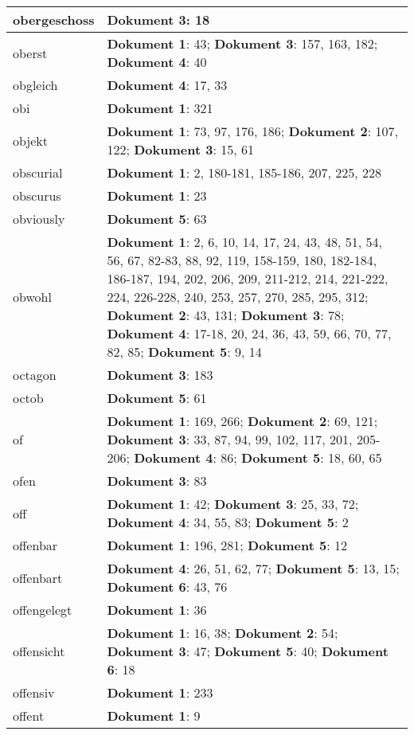 \documentclass[a5paper]{article}
\begin{document}
\begin{longtable}[l]{|l|p{3in}|}
\hline
obergeschoss & \textbf{Dokument 3}: 18 \\
\hline
oberst & \textbf{Dokument 1}: 43; \textbf{Dokument 3}: 157, 163, 182; \textbf{Dokument 4}: 40 \\
\hline
obgleich & \textbf{Dokument 4}: 17, 33 \\
\hline
obi & \textbf{Dokument 1}: 321 \\
\hline
objekt & \textbf{Dokument 1}: 73, 97, 176, 186; \textbf{Dokument 2}: 107, 122; \textbf{Dokument 3}: 15, 61 \\
\hline
obscurial & \textbf{Dokument 1}: 2, 180-181, 185-186, 207, 225, 228 \\
\hline
obscurus & \textbf{Dokument 1}: 23 \\
\hline
obviously & \textbf{Dokument 5}: 63 \\
\hline
obwohl & \textbf{Dokument 1}: 2, 6, 10, 14, 17, 24, 43, 48, 51, 54, 56, 67, 82-83, 88, 92, 119, 158-159, 180, 182-184, 186-187, 194, 202, 206, 209, 211-212, 214, 221-222, 224, 226-228, 240, 253, 257, 270, 285, 295, 312; \textbf{Dokument 2}: 43, 131; \textbf{Dokument 3}: 78; \textbf{Dokument 4}: 17-18, 20, 24, 36, 43, 59, 66, 70, 77, 82, 85; \textbf{Dokument 5}: 9, 14 \\
\hline
octagon & \textbf{Dokument 3}: 183 \\
\hline
octob & \textbf{Dokument 5}: 61 \\
\hline
of & \textbf{Dokument 1}: 169, 266; \textbf{Dokument 2}: 69, 121; \textbf{Dokument 3}: 33, 87, 94, 99, 102, 117, 201, 205-206; \textbf{Dokument 4}: 86; \textbf{Dokument 5}: 18, 60, 65 \\
\hline
ofen & \textbf{Dokument 3}: 83 \\
\hline
off & \textbf{Dokument 1}: 42; \textbf{Dokument 3}: 25, 33, 72; \textbf{Dokument 4}: 34, 55, 83; \textbf{Dokument 5}: 2 \\
\hline
offenbar & \textbf{Dokument 1}: 196, 281; \textbf{Dokument 5}: 12 \\
\hline
offenbart & \textbf{Dokument 4}: 26, 51, 62, 77; \textbf{Dokument 5}: 13, 15; \textbf{Dokument 6}: 43, 76 \\
\hline
offengelegt & \textbf{Dokument 1}: 36 \\
\hline
offensicht & \textbf{Dokument 1}: 16, 38; \textbf{Dokument 2}: 54; \textbf{Dokument 3}: 47; \textbf{Dokument 5}: 40; \textbf{Dokument 6}: 18 \\
\hline
offensiv & \textbf{Dokument 1}: 233 \\
\hline
offent & \textbf{Dokument 1}: 9 \\

\end{longtable}
\end{document}
